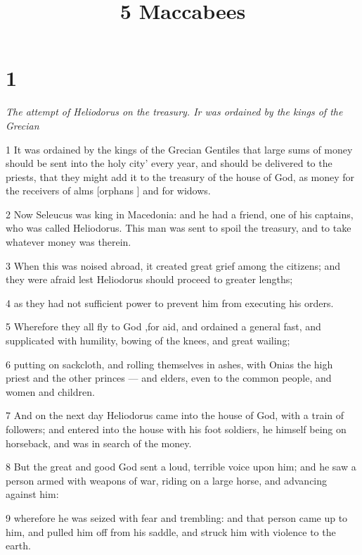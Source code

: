 

\title{5 Maccabees}


\chapter{1}

\par \textit {The attempt of Heliodorus on the treasury. Ir was ordained by the kings of the Grecian}

\par 1 It was ordained by the kings of the Grecian Gentiles that large sums of money should be sent into the holy city’ every year, and should be delivered to the priests, that they might add it to the treasury of the house of God, as money for the receivers of alms [orphans ] and for widows. 

\par 2 Now Seleucus was king in Macedonia: and he had a friend, one of his captains, who was called Heliodorus. This man was sent to spoil the treasury, and to take whatever money was therein. 

\par 3 When this was noised abroad, it created great grief among the citizens; and they were afraid lest Heliodorus should proceed to greater lengths; 

\par 4 as they had not sufficient power to prevent him from executing his orders. 

\par 5 Wherefore they all fly to God ,for aid, and ordained a general fast, and supplicated with humility, bowing of the knees, and great wailing; 

\par 6 putting on sackcloth, and rolling themselves in ashes, with Onias the high priest and the other princes — and elders, even to the common people, and women and children. 

\par 7 And on the next day Heliodorus came into the house of God, with a train of followers; and entered into the house with his foot soldiers, he himself being on horseback, and was in search of the money. 

\par 8 But the great and good God sent a loud, terrible voice upon him; and he saw a person armed with weapons of war, riding on a large horse, and advancing against him: 

\par 9 wherefore he was seized with fear and trembling: and that person came up to him, and pulled him off from his saddle, and struck him with violence to the earth. 

